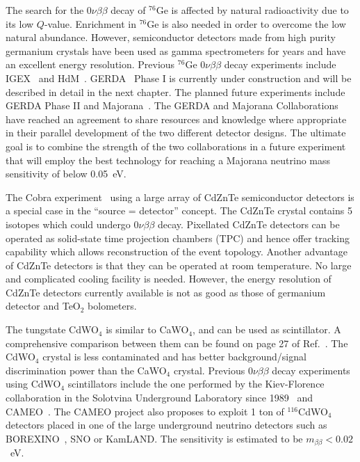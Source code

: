 The search for the $0\nu\beta\beta$ decay of $^{76}$Ge is affected by natural radioactivity due to its low $Q$-value. Enrichment in $^{76}$Ge is also needed in order to overcome the low natural abundance. However, semiconductor detectors made from high purity germanium crystals have been used as gamma spectrometers for years and have an excellent energy resolution. Previous $^{76}$Ge $0\nu\beta\beta$ decay experiments include IGEX~\cite{Aal02} and HdM~\cite{Hei04}. GERDA~\cite{Sch05} Phase I is currently under construction and will be described in detail in the next chapter. The planned future experiments include GERDA Phase II and Majorana~\cite{Gai03, Aal04}. The GERDA and Majorana Collaborations have reached an agreement to share resources and knowledge where appropriate in their parallel development of the two different detector designs. The ultimate goal is to combine the strength of the two collaborations in a future experiment that will employ the best technology for reaching a Majorana neutrino mass sensitivity of below 0.05~eV.

The Cobra experiment~\cite{Zub01, Ell02, Kie03} using a large array of CdZnTe semiconductor detectors is a special case in the ``source = detector'' concept. The CdZnTe crystal contains 5 isotopes which could undergo $0\nu\beta\beta$ decay. Pixellated CdZnTe detectors can be operated as solid-state time projection chambers (TPC) and hence offer tracking capability which allows reconstruction of the event topology. Another advantage of CdZnTe detectors is that they can be operated at room temperature. No large and complicated cooling facility is needed. However, the energy resolution of CdZnTe detectors currently available is not as good as those of germanium detector and TeO$_{2}$ bolometers.

The tungstate CdWO$_{4}$ is similar to CaWO$_{4}$, and can be used as scintillator. A comprehensive comparison between them can be found on page 27 of Ref.~\cite{Avi05}. The CdWO$_{4}$ crystal is less contaminated and has better background/signal discrimination power than the CaWO$_{4}$ crystal. Previous $0\nu\beta\beta$ decay experiments using CdWO$_{4}$ scintillators include the one performed by the Kiev-Florence collaboration in the Solotvina Underground Laboratory since 1989~\cite{Dan00, Dan03} and CAMEO~\cite{Bel00, Bel01}. The CAMEO project also proposes to exploit 1 ton of $^{116}$CdWO$_{4}$ detectors placed in one of the large underground neutrino detectors such as BOREXINO~\cite{Arp08}, SNO or KamLAND. The sensitivity is estimated to be $m_{\beta\beta} < 0.02$~eV.

